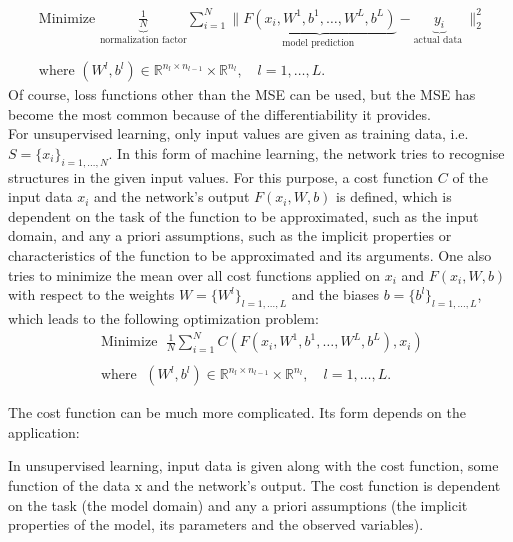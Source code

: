 \begin{equation*}
    \begin{gathered}
        \text{ Minimize } \underbrace{\frac{1}{N}}_{\text{normalization factor}} \sum_{i=1}^{N} \lVert \underbrace{F\left(x_{i}, W^{1}, b^{1}, \ldots, W^{L}, b^{L}\right)}_{\text{model prediction }} - \underbrace{y_{i}}_{\text{actual data }} \rVert^{2}_2 \\
        \\
        \text{ where }\left(W^{l}, b^{l}\right) \in \mathbb{R}^{n_l \times n_{l-1}} \times \mathbb{R}^{n_l}, \quad l=1, \ldots, L .
    \end{gathered}
\end{equation*}
Of course, loss functions other than the MSE can be used, but the MSE has become the most common because of the differentiability it provides. \\
For unsupervised learning, only input values are given as training data, i.e. $S = \{ x_i \}_{i = 1, \ldots, N}$. In this form of machine learning, the network tries to recognise structures in the given input values. For this purpose, a cost function $C$ of the input data $x_i$ and the network's output $F(x_i, W, b)$ is defined, which is dependent on the task of the function to be approximated, such as the input domain, and any a priori assumptions, such as the implicit properties or characteristics of the function to be approximated and its arguments. One also tries to minimize the mean over all cost functions applied on $x_i$ and $F(x_i, W, b)$ with respect to the weights $W = \{ W^l \}_{l = 1, \ldots, L}$ and the biases $b = \{ b^l \}_{l = 1, \ldots, L}$, which leads to the following optimization problem:
\begin{equation*}
    \begin{gathered}
        \text{ Minimize } \; \frac{1}{N} \sum_{i=1}^{N}  C \left( F \left( x_{i}, W^{1}, b^{1}, \ldots, W^{L}, b^{L}\right), x_i \right) \\
        \\
        \text{ where } \; \left(W^{l}, b^{l}\right) \in \mathbb{R}^{n_l \times n_{l-1}} \times \mathbb{R}^{n_l}, \quad l=1, \ldots, L .
    \end{gathered}
\end{equation*}


The cost function can be much more complicated. Its form depends on the application:



In unsupervised learning, input data is given along with the cost function, some function of the data x and the network's output. The cost function is dependent on the task (the model domain) and any a priori assumptions (the implicit properties of the model, its parameters and the observed variables).


